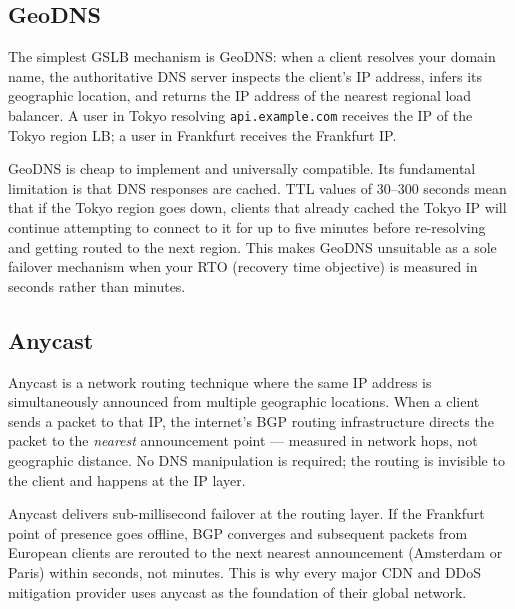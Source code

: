 \documentclass[11pt,a4paper]{article}
\begin{document}
\subsection{GeoDNS}

The simplest GSLB mechanism is GeoDNS: when a client resolves your domain name, the authoritative
DNS server inspects the client's IP address, infers its geographic location, and returns the IP
address of the nearest regional load balancer. A user in Tokyo resolving \texttt{api.example.com}
receives the IP of the Tokyo region LB; a user in Frankfurt receives the Frankfurt IP.

GeoDNS is cheap to implement and universally compatible. Its fundamental limitation is that DNS
responses are cached. TTL values of 30--300 seconds mean that if the Tokyo region goes down,
clients that already cached the Tokyo IP will continue attempting to connect to it for up to five
minutes before re-resolving and getting routed to the next region. This makes GeoDNS unsuitable
as a sole failover mechanism when your RTO (recovery time objective) is measured in seconds rather
than minutes.

\subsection{Anycast}

Anycast is a network routing technique where the same IP address is simultaneously announced from
multiple geographic locations. When a client sends a packet to that IP, the internet's BGP routing
infrastructure directs the packet to the \emph{nearest} announcement point --- measured in network
hops, not geographic distance. No DNS manipulation is required; the routing is invisible to the
client and happens at the IP layer.

Anycast delivers sub-millisecond failover at the routing layer. If the Frankfurt point of presence
goes offline, BGP converges and subsequent packets from European clients are rerouted to the next
nearest announcement (Amsterdam or Paris) within seconds, not minutes. This is why every major
CDN and DDoS mitigation provider uses anycast as the foundation of their global network.
\end{document}
